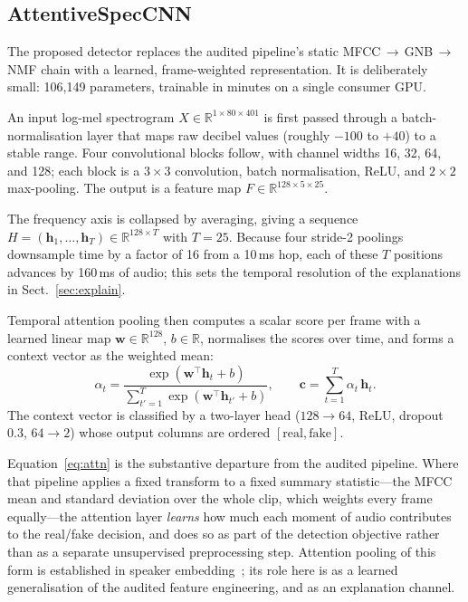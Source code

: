 \documentclass[sn-mathphys-num,pdflatex]{sn-jnl}
\begin{document}
\subsection{AttentiveSpecCNN}\label{sec:model}

The proposed detector replaces the audited pipeline's static
MFCC\,$\rightarrow$\,GNB\,$\rightarrow$\,NMF chain with a learned,
frame-weighted representation. It is deliberately small: 106{,}149 parameters,
trainable in minutes on a single consumer GPU.

An input log-mel spectrogram $X \in \mathbb{R}^{1 \times 80 \times 401}$ is first
passed through a batch-normalisation layer that maps raw decibel values (roughly
$-100$ to $+40$) to a stable range. Four convolutional blocks follow, with
channel widths 16, 32, 64, and 128; each block is a $3\times3$ convolution,
batch normalisation, ReLU, and $2\times2$ max-pooling. The output is a feature
map $F \in \mathbb{R}^{128 \times 5 \times 25}$.

The frequency axis is collapsed by averaging, giving a sequence
$H = (\mathbf{h}_1, \dots, \mathbf{h}_T) \in \mathbb{R}^{128 \times T}$ with
$T = 25$. Because four stride-2 poolings downsample time by a factor of 16 from
a 10\,ms hop, each of these $T$ positions advances by 160\,ms of audio; this sets
the temporal resolution of the explanations in Sect.~\ref{sec:explain}.

Temporal attention pooling then computes a scalar score per frame with a learned
linear map $\mathbf{w} \in \mathbb{R}^{128}$, $b \in \mathbb{R}$, normalises the
scores over time, and forms a context vector as the weighted mean:
\begin{equation}
\alpha_t = \frac{\exp(\mathbf{w}^\top \mathbf{h}_t + b)}
                {\sum_{t'=1}^{T} \exp(\mathbf{w}^\top \mathbf{h}_{t'} + b)},
\qquad
\mathbf{c} = \sum_{t=1}^{T} \alpha_t \, \mathbf{h}_t .
\label{eq:attn}
\end{equation}
The context vector is classified by a two-layer head
($128 \rightarrow 64$, ReLU, dropout 0.3, $64 \rightarrow 2$) whose output
columns are ordered $[\text{real}, \text{fake}]$.

Equation~\eqref{eq:attn} is the substantive departure from the audited pipeline.
Where that pipeline applies a fixed transform to a fixed summary statistic---the
MFCC mean and standard deviation over the whole clip, which weights every frame
equally---the attention layer \emph{learns} how much each moment of audio
contributes to the real/fake decision, and does so as part of the detection
objective rather than as a separate unsupervised preprocessing step. Attention
pooling of this form is established in speaker embedding~\cite{attnpool}; its
role here is as a learned generalisation of the audited feature engineering, and
as an explanation channel.
\end{document}
